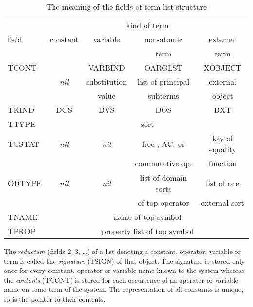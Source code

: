 \begin{table}
\begin{center}
\begin{tabular}{|l|c|c|c|c|}
 \hline
         & \multicolumn{4}{c|}{kind of term} \\
 field   & constant       & variable   & non-atomic   & external \\
         &                &            & term         & term     \\
 \hline\hline
 TCONT   &                & VARBIND    & OARGLST      & XOBJECT \\
         & {\it nil}      & substitution & list of principal & external \\
         &                & value      & subterms     & object \\
 \hline
 TKIND   & DCS            & DVS        & DOS          & DXT \\
 \hline
 TTYPE   & \multicolumn{4}{c|}{sort} \\
 \hline
 TUSTAT  & {\it nil}      & {\it nil}  & free-, AC- or & key of equality \\
         &                &            & commutative op. & function \\
 \hline
 ODTYPE  & {\it nil}      & {\it nil}  & list of domain sorts & list of one \\
         &                &            & of top operator      & external sort \\
 \hline  
 TNAME   & \multicolumn{4}{c|}{name of top symbol} \\
 \hline
 TPROP   & \multicolumn{4}{c|}{property list of top symbol} \\
 \hline
\end{tabular}
\caption{The meaning of the fields of term list structure} \label{tb:tse}
\end{center}
\end{table}

The {\em reductum} (fields 2, 3, \ldots) of a list denoting a constant, 
operator, variable or term is called the {\em signature} (TSIGN) of that object.
The signature is stored only once for every constant, operator or
variable name known to the system whereas the {\em contents} (TCONT) is stored
for each occurrence of an operator or variable name on some term of the system.
The representation of all constants is unique, so is the pointer to
their contents.

